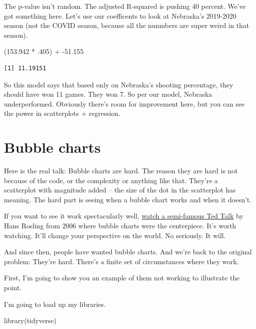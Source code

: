 \documentclass[
  letterpaper,
  DIV=11,
  numbers=noendperiod]{scrreprt}
\newenvironment{Shaded}{\begin{snugshade}}{\end{snugshade}}
\newcommand{\DecValTok}[1]{\textcolor[rgb]{0.68,0.00,0.00}{#1}}
\newcommand{\FloatTok}[1]{\textcolor[rgb]{0.68,0.00,0.00}{#1}}
\newcommand{\FunctionTok}[1]{\textcolor[rgb]{0.28,0.35,0.67}{#1}}
\newcommand{\NormalTok}[1]{\textcolor[rgb]{0.00,0.23,0.31}{#1}}
\newcommand{\SpecialCharTok}[1]{\textcolor[rgb]{0.37,0.37,0.37}{#1}}
\begin{document}
The p-value isn't random. The adjusted R-squared is pushing 40 percent.
We've got something here. Let's use our coefficents to look at
Nebraska's 2019-2020 season (not the COVID season, because all the
nunmbers are super weird in that season).

\begin{Shaded}
\begin{Highlighting}[]
\NormalTok{(}\FloatTok{153.942} \SpecialCharTok{*}\NormalTok{ .}\DecValTok{405}\NormalTok{) }\SpecialCharTok{+} \SpecialCharTok{{-}}\FloatTok{51.155} 
\end{Highlighting}
\end{Shaded}

\begin{verbatim}
[1] 11.19151
\end{verbatim}

So this model says that based only on Nebraska's shooting percentage,
they should have won 11 games. They won 7. So per our model, Nebraska
underperformed. Obviously there's room for improvement here, but you can
see the power in scatterplots + regression.


\hypertarget{bubble-charts}{%
\chapter{Bubble charts}\label{bubble-charts}}

Here is the real talk: Bubble charts are hard. The reason they are hard
is not because of the code, or the complexity or anything like that.
They're a scatterplot with magnitude added -- the size of the dot in the
scatterplot has meaning. The hard part is seeing when a bubble chart
works and when it doesn't.

If you want to see it work spectacularly well,
\href{https://www.youtube.com/watch?v=hVimVzgtD6w}{watch a semi-famous
Ted Talk} by Hans Rosling from 2006 where bubble charts were the
centerpiece. It's worth watching. It'll change your perspective on the
world. No seriously. It will.

And since then, people have wanted bubble charts. And we're back to the
original problem: They're hard. There's a finite set of circumstances
where they work.

First, I'm going to show you an example of them not working to
illustrate the point.

I'm going to load up my libraries.

\begin{Shaded}
\begin{Highlighting}[]
\FunctionTok{library}\NormalTok{(tidyverse)}
\end{Highlighting}
\end{Shaded}
\end{document}
